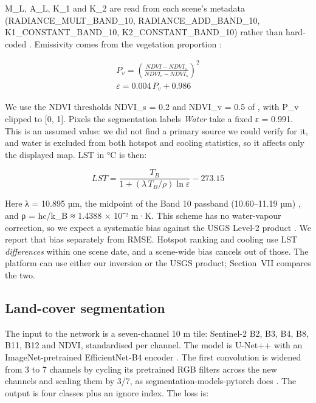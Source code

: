 \documentclass[conference]{IEEEtran}
\begin{document}
M\_L, A\_L, K\_1 and K\_2 are read from each scene's metadata
(RADIANCE\_MULT\_BAND\_10, RADIANCE\_ADD\_BAND\_10,
K1\_CONSTANT\_BAND\_10, K2\_CONSTANT\_BAND\_10) rather than hard-coded
\cite{b1}. Emissivity comes from the vegetation proportion
\cite{b1,b14}:

\begin{equation}
\begin{gathered}
P_v = \left( \frac{NDVI - NDVI_s}{NDVI_v - NDVI_s} \right)^{2} \\
\varepsilon = 0.004\,P_v + 0.986
\end{gathered}
\end{equation}

We use the NDVI thresholds NDVI\_s = 0.2 and NDVI\_v = 0.5 of
\cite{b14}, with P\_v clipped to {[}0, 1{]}. Pixels the segmentation
labels \emph{Water} take a fixed ε = 0.991. This is an assumed value: we
did not find a primary source we could verify for it, and water is
excluded from both hotspot and cooling statistics, so it affects only
the displayed map. LST in °C is then:

\begin{equation}
LST = \frac{T_B}{1 + \left( \lambda \, T_B / \rho \right) \ln \varepsilon} - 273.15
\end{equation}

Here λ = 10.895 µm, the midpoint of the Band 10 passband (10.60--11.19
µm) \cite{b23}, and ρ = hc/k\_B ≈ 1.4388 × 10⁻² m·K. This scheme has no
water-vapour correction, so we expect a systematic bias against the USGS
Level-2 product \cite{b12}. We report that bias separately from RMSE.
Hotspot ranking and cooling use LST \emph{differences} within one scene
date, and a scene-wide bias cancels out of those. The platform can use
either our inversion or the USGS product; Section~VII compares the two.

\subsection{Land-cover segmentation}\label{land-cover-segmentation}

The input to the network is a seven-channel 10 m tile: Sentinel-2 B2,
B3, B4, B8, B11, B12 and NDVI, standardised per channel. The model is
U-Net++ \cite{b6} with an ImageNet-pretrained EfficientNet-B4 encoder
\cite{b7}. The first convolution is widened from 3 to 7 channels by
cycling its pretrained RGB filters across the new channels and scaling
them by 3/7, as segmentation-models-pytorch does \cite{b24}. The output
is four classes plus an ignore index. The loss is:
\end{document}
